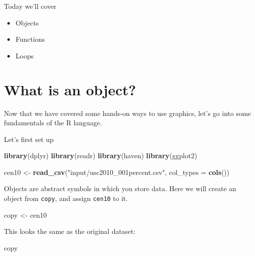 \documentclass[]{book}
\newenvironment{Shaded}{\begin{snugshade}}{\end{snugshade}}
\newcommand{\DataTypeTok}[1]{\textcolor[rgb]{0.13,0.29,0.53}{#1}}
\newcommand{\KeywordTok}[1]{\textcolor[rgb]{0.13,0.29,0.53}{\textbf{#1}}}
\newcommand{\NormalTok}[1]{#1}
\newcommand{\StringTok}[1]{\textcolor[rgb]{0.31,0.60,0.02}{#1}}
\providecommand{\tightlist}{%
  \setlength{\itemsep}{0pt}\setlength{\parskip}{0pt}}
\theoremstyle{definition}
\theoremstyle{definition}
\theoremstyle{definition}
\theoremstyle{remark}
\begin{document}
Today we'll cover

\begin{itemize}
\tightlist
\item
  Objects
\item
  Functions
\item
  Loops
\end{itemize}

\hypertarget{what-is-an-object}{%
\section{What is an object?}\label{what-is-an-object}}

Now that we have covered some hands-on ways to use graphics, let's go into some fundamentals of the R language.

Let's first set up

\begin{Shaded}
\begin{Highlighting}[]
\KeywordTok{library}\NormalTok{(dplyr)}
\KeywordTok{library}\NormalTok{(readr)}
\KeywordTok{library}\NormalTok{(haven)}
\KeywordTok{library}\NormalTok{(ggplot2)}
\end{Highlighting}
\end{Shaded}

\begin{Shaded}
\begin{Highlighting}[]
\NormalTok{cen10 <-}\StringTok{ }\KeywordTok{read_csv}\NormalTok{(}\StringTok{"input/usc2010_001percent.csv"}\NormalTok{, }\DataTypeTok{col_types =} \KeywordTok{cols}\NormalTok{())}
\end{Highlighting}
\end{Shaded}

Objects are abstract symbols in which you store data. Here we will create an object from \texttt{copy}, and assign \texttt{cen10} to it.

\begin{Shaded}
\begin{Highlighting}[]
\NormalTok{copy <-}\StringTok{ }\NormalTok{cen10 }
\end{Highlighting}
\end{Shaded}

This looks the same as the original dataset:

\begin{Shaded}
\begin{Highlighting}[]
\NormalTok{copy}
\end{Highlighting}
\end{Shaded}
\end{document}
